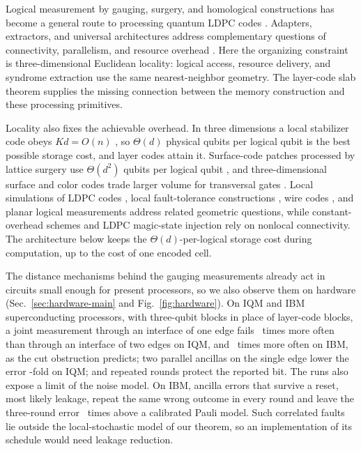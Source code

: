 Logical measurement by gauging, surgery, and homological constructions has
become a general route to processing quantum LDPC codes
\cite{WilliamsonYoderGauging,CowtanParallelSurgery,YuanParsimonious2026,IdeHomological,BerentLiftedSurgery}.
Adapters, extractors, and universal architectures address complementary
questions of connectivity, parallelism, and resource overhead
\cite{SwaroopAdapters,HeExtractors,ZhangGoodQLDPC,MalcolmEfficientQLDPC}.
Here the organizing constraint is three-dimensional Euclidean locality:
logical access, resource delivery, and syndrome extraction use the same
nearest-neighbor geometry. The layer-code slab theorem supplies the missing
connection between the memory construction and these processing primitives.

Locality also fixes the achievable overhead. In three dimensions a local
stabilizer code obeys $Kd=O(n)$ \cite{BPT}, so $\Theta(d)$ physical qubits
per logical qubit is the best possible storage cost, and layer codes attain
it. Surface-code patches processed by lattice surgery use $\Theta(d^2)$
qubits per logical qubit \cite{HorsmanLatticeSurgery,LitinskiSurgery}, and
three-dimensional surface and color codes trade larger volume for
transversal gates \cite{VasmerBrowne}. Local simulations of LDPC codes
\cite{PattisonHierarchical}, local fault-tolerance constructions
\cite{ChoeKoenigLocal}, wire codes \cite{BaspinWire}, and planar logical
measurements \cite{YangPlanar} address related geometric questions, while
constant-overhead schemes
\cite{GottesmanFTThreshold,KovalevPryadko,FawziGrospellierLeverrier} and LDPC
magic-state injection \cite{ZhangInjectionIndependence,LiuInSituInjection}
rely on nonlocal connectivity. The architecture below keeps the
$\Theta(d)$-per-logical storage cost during computation, up to the cost of
one encoded cell.

The distance mechanisms behind the gauging measurements already act in circuits
small enough for present processors, so we also observe them on hardware
(Sec.~\ref{sec:hardware-main} and Fig.~\ref{fig:hardware}).  On IQM and IBM
superconducting processors, with three-qubit blocks in place of layer-code
blocks, a joint measurement through an interface of one edge fails
\hwIQMfold~times more often than through an interface of two edges on IQM, and
\hwIBMfoldOneTwo~times more often on IBM, as the cut obstruction predicts; two
parallel ancillas on the single edge lower the error
\hwMultFold-fold on IQM; and repeated rounds protect the reported bit.  The runs also
expose a limit of the noise model.  On IBM, ancilla errors that survive a
reset, most likely leakage, repeat the same wrong outcome in every round and
leave the three-round error \hwRndIBMModelRatio~times above a calibrated Pauli
model.  Such correlated faults lie outside the local-stochastic model of our
theorem, so an implementation of its schedule would need leakage reduction.

